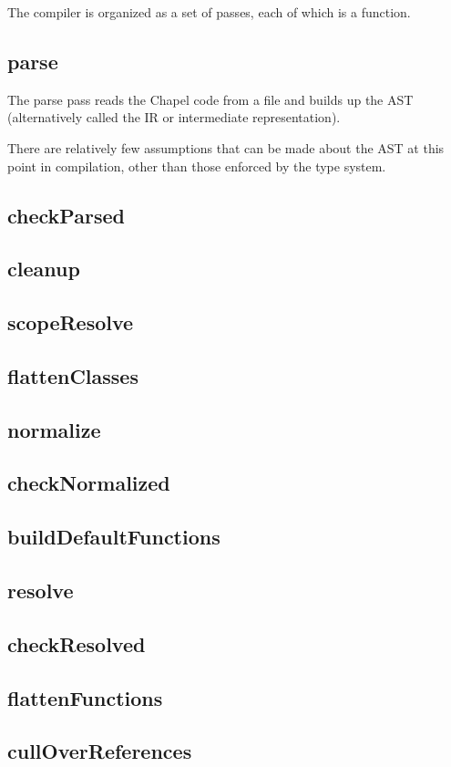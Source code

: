 \documentclass[10pt]{article}
\begin{document}
The compiler is organized as a set of passes, each of which is a
function.

\subsection{parse}

The parse pass reads the Chapel code from a file and builds up the AST
(alternatively called the IR or intermediate representation).

There are relatively few assumptions that can be made about the AST at
this point in compilation, other than those enforced by the type
system.

\subsection{checkParsed}
\subsection{cleanup}
\subsection{scopeResolve}
\subsection{flattenClasses}
\subsection{normalize}
\subsection{checkNormalized}
\subsection{buildDefaultFunctions}
\subsection{resolve}
\subsection{checkResolved}
\subsection{flattenFunctions}
\subsection{cullOverReferences}
\end{document}
